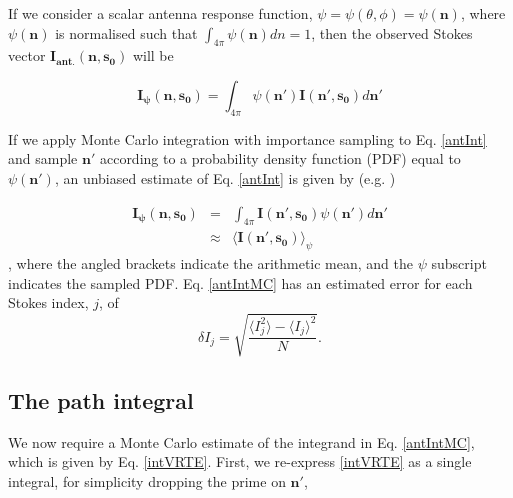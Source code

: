 If we consider a scalar antenna response function,
$\psi=\psi(\theta,\phi)=\psi(\mathbf{n})$, where $\psi(\mathbf{n})$ is
normalised such that $\int_{4\pi}\psi(\mathbf{n})dn=1$, then the
observed Stokes vector $\mathbf{I_{ant.}(n,s_0)}$ will be

\begin{equation}
\mathbf{I_\psi(n,s_0)}=\int_{4\pi}\psi(\mathbf{n'})\mathbf{I(n',s_0)}d\mathbf{n'}
\label{antInt}
\end{equation}

If we apply Monte Carlo integration with importance sampling to
Eq. \ref{antInt} and sample $\mathbf{n'}$ according to a probability
density function (PDF) equal to $\psi(\mathbf{n'})$, an unbiased
estimate of Eq. \ref{antInt} is given by (e.g. \cite{press:92})

\begin{eqnarray}
\mathbf{I_\psi(n,s_0)}&=&\int_{4\pi}\mathbf{I(n',s_0)}\psi(\mathbf{n'})d\mathbf{n'}\\
&\approx&\langle \mathbf{I(n',s_0)} \rangle_\psi
\label{antIntMC}
\end{eqnarray}
, where the angled brackets indicate the arithmetic mean, and the $\psi$ subscript indicates the sampled PDF.  Eq. \ref{antIntMC} has an estimated error for each Stokes index, $j$,  of
\begin{equation}
\delta I_j=\sqrt{\frac{\langle I_j^2\rangle-\langle I_j\rangle^2}{N}}.
\label{error}
\end{equation}

\subsection{The path integral}
\label{sec:path_integral}
We now require a Monte Carlo estimate of the integrand in
Eq. \ref{antIntMC}, which is given by Eq. \ref{intVRTE}.  First, we
re-express \ref{intVRTE} as a single integral, for simplicity dropping
the prime on $\mathbf{n'}$,

